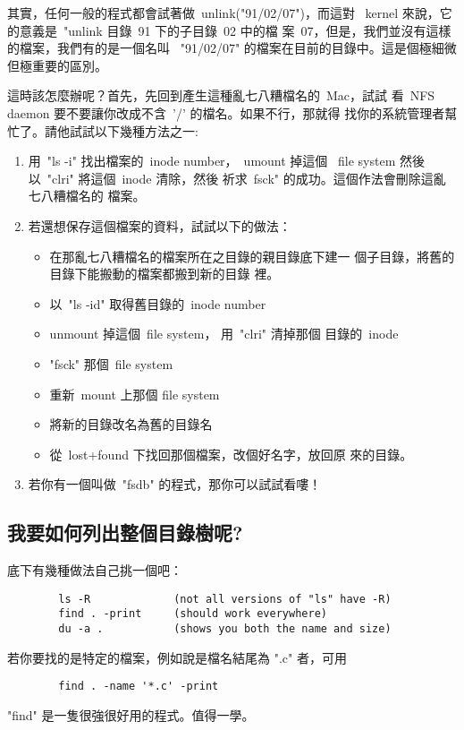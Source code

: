 \documentclass{article}
\begin{document}
\begin{CJK*}{Bg5}{ming}
	其實，任何一般的程式都會試著做~unlink("91/02/07")，而這對 
	~kernel 來說，它的意義是~"unlink 目錄~91 下的子目錄~02 中的檔
	案~07，但是，我們並沒有這樣的檔案，我們有的是一個名叫 
	~"91/02/07" 的檔案在目前的目錄中。這是個極細微但極重要的區別。

	這時該怎麼辦呢？首先，先回到產生這種亂七八糟檔名的~Mac，試試
	看~NFS daemon 要不要讓你改成不含~'/' 的檔名。如果不行，那就得
	找你的系統管理者幫忙了。請他試試以下幾種方法之一: 
	\begin{enumerate}
	\item 用~"ls -i" 找出檔案的~inode number，~umount 掉這個 
	  ~file system 然後以~"clri" 將這個~inode 清除，然後
	   祈求~fsck" 的成功。這個作法會刪除這亂七八糟檔名的
	   檔案。

	\item 若還想保存這個檔案的資料，試試以下的做法：
	\begin{itemize}
	   \item 在那亂七八糟檔名的檔案所在之目錄的親目錄底下建一
	    個子目錄，將舊的目錄下能搬動的檔案都搬到新的目錄
	    裡。
	   \item 以~"ls -id" 取得舊目錄的~inode number
	   \item unmount 掉這個~file system， 用~"clri" 清掉那個
	    目錄的~inode
	   \item "fsck" 那個~file system
	   \item 重新~mount 上那個 file system
	   \item 將新的目錄改名為舊的目錄名
	   \item 從~lost+found 下找回那個檔案，改個好名字，放回原
	    來的目錄。
	\end{itemize}

	\item 若你有一個叫做~"fsdb" 的程式，那你可以試試看嘍！
	\end{enumerate}

\subsection{我要如何列出整個目錄樹呢?}

	底下有幾種做法自己挑一個吧：
\begin{verbatim}
        ls -R             (not all versions of "ls" have -R)
        find . -print     (should work everywhere)
        du -a .           (shows you both the name and size)
\end{verbatim}

	若你要找的是特定的檔案，例如說是檔名結尾為 ".c" 者，可用
\begin{verbatim}
        find . -name '*.c' -print
\end{verbatim}
	"find" 是一隻很強很好用的程式。值得一學。


\end{CJK*}
\end{document}
